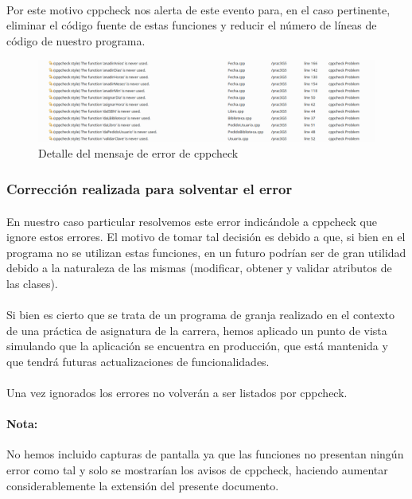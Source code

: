 			\paragraph{}Por este motivo cppcheck nos alerta de este evento para, en el caso pertinente, eliminar el código fuente de estas funciones y reducir el número de líneas de código de nuestro programa.
		
			\begin{figure}[H]
				\centering
				\includegraphics[scale=0.38]{img/captura62.png}
				\caption{Detalle del mensaje de error de cppcheck}
				\label{captura62}
			\end{figure}
		
		\subsubsection{Corrección realizada para solventar el error}
		
			\paragraph{}En nuestro caso particular resolvemos este error indicándole a cppcheck que ignore estos errores. El motivo de tomar tal decisión es debido a que, si bien en el programa no se utilizan estas funciones, en un futuro podrían ser de gran utilidad debido a la naturaleza de las mismas (modificar, obtener y validar atributos de las clases).
			
			\paragraph{}Si bien es cierto que se trata de un programa de granja realizado en el contexto de una práctica de asignatura de la carrera, hemos aplicado un punto de vista simulando que la aplicación se encuentra en producción, que está mantenida y que tendrá futuras actualizaciones de funcionalidades.
			
			\paragraph{}Una vez ignorados los errores no volverán a ser listados por cppcheck.
			
			\paragraph{Nota:}No hemos incluido capturas de pantalla ya que las funciones no presentan ningún error como tal y solo se mostrarían los avisos de cppcheck, haciendo aumentar considerablemente la extensión del presente documento.
	
\newpage